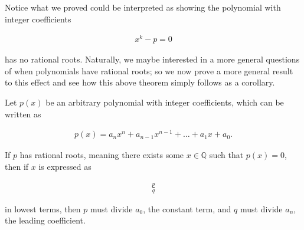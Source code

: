 \documentclass[twoside]{report}
\begin{document}
\vspace{\baselineskip}

Notice what we proved could be interpreted as showing the polynomial with integer coefficients
	
	\begin{align*}
		x^k - p = 0
	\end{align*}
	
has no rational roots. Naturally, we maybe interested in a more general questions of when polynomials have rational roots; so we now prove a more general result to this effect and see how this above theorem simply follows as a corollary.

\vspace{\baselineskip}
\begin{theorem}
	Let $p(x)$ be an arbitrary polynomial with integer coefficients, which can be written as
	
	\begin{align*}
		p(x) = a_n x^n + a_{n - 1} x^{n - 1} + \dots + a_1 x + a_0.
	\end{align*}
	
	If $p$ has rational roots, meaning there exists some $x \in \mathbb{Q}$ such that $p(x) = 0$, then if $x$ is expressed as
	
	\begin{align*}
		\frac{p}{q}
	\end{align*}
	
	in lowest terms, then $p$ must divide $a_0$, the constant term, and $q$ must divide $a_n$, the leading coefficient.
\end{theorem}
\end{document}
